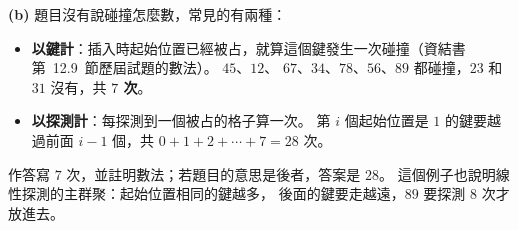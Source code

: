 \begin{pastsoln}
\textbf{(b)} 題目沒有說碰撞怎麼數，常見的有兩種：
\begin{itemize}
\item \textbf{以鍵計}：插入時起始位置已經被占，就算這個鍵發生一次碰撞（資結書第~12.9~節歷屆試題的數法）。 $45$、$12$、
$67$、$34$、$78$、$56$、$89$ 都碰撞，$23$ 和 $31$ 沒有，共 \textbf{$7$ 次}。
\item \textbf{以探測計}：每探測到一個被占的格子算一次。 第 $i$ 個起始位置是 $1$ 的鍵要越過前面 $i - 1$ 個，共
$0 + 1 + 2 + \cdots + 7 = 28$ 次。
\end{itemize}
作答寫 $7$ 次，並註明數法；若題目的意思是後者，答案是 $28$。 這個例子也說明線性探測的主群聚：起始位置相同的鍵越多，
後面的鍵要走越遠，$89$ 要探測 $8$ 次才放進去。
\end{pastsoln}
